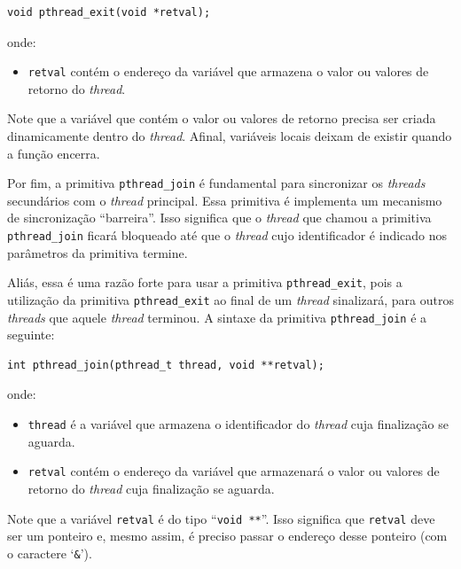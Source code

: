 \begin{lstlisting}[style=MyCStyle, frame=none, numbers=none]
       void pthread_exit(void *retval);
\end{lstlisting}

onde: 
\begin{itemize}
    \item \texttt{retval} contém o endereço da variável que armazena o valor ou valores de retorno do \textit{thread}.
\end{itemize}

Note que a variável que contém o valor ou valores de retorno precisa ser criada dinamicamente dentro do \textit{thread}. Afinal, variáveis locais deixam de existir quando a função encerra.

Por fim, a primitiva \texttt{pthread\_join} é fundamental para sincronizar os \textit{threads} secundários com o \textit{thread} principal. Essa primitiva é implementa um mecanismo de sincronização \enquote{barreira}. Isso significa que o \textit{thread} que chamou a primitiva \texttt{pthread\_join} ficará bloqueado até que o \textit{thread} cujo identificador é indicado nos parâmetros da primitiva termine. 

Aliás, essa é uma razão forte para usar a primitiva \texttt{pthread\_exit}, pois a utilização da primitiva \texttt{pthread\_exit} ao final de um \textit{thread} sinalizará, para outros \textit{threads} que aquele \textit{thread} terminou. A sintaxe da primitiva \texttt{pthread\_join} é a seguinte:

\begin{lstlisting}[style=MyCStyle, frame=none, numbers=none]
       int pthread_join(pthread_t thread, void **retval);
\end{lstlisting}

onde: 
\begin{itemize}
    \item \texttt{thread} é a variável que armazena o identificador do \textit{thread} cuja finalização se aguarda.
    \item \texttt{retval} contém o endereço da variável que armazenará o valor ou valores de retorno do \textit{thread} cuja finalização se aguarda.
\end{itemize}

Note que a variável \texttt{retval} é do tipo \enquote{\texttt{void **}}. Isso significa que \texttt{retval} deve ser um ponteiro e, mesmo assim, é preciso passar o endereço desse ponteiro (com o caractere `\texttt{\&}').



